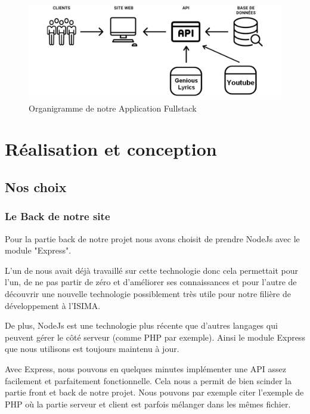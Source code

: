 \documentclass[12pt,french]{article}
\begin{document}
\begin{figure}[H]
	\centering
	\includegraphics[scale=0.4]{fullstack.png}
	\caption{Organigramme de notre Application Fullstack}    
\end{figure}

\section{Réalisation et conception}

\subsection{Nos choix}

\subsubsection{Le Back de notre site}

Pour la partie back de notre projet nous avons choisit de prendre NodeJs avec le module "Express".

\medskip

L'un de nous avait déjà travaillé sur cette technologie donc cela permettait pour l'un, de ne pas partir de zéro et d'améliorer ses connaissances et pour l'autre de découvrir une nouvelle technologie possiblement très utile pour notre filière de développement à l'ISIMA.

\medskip

De plus, NodeJs est une technologie plus récente que d'autres langages qui peuvent gérer le côté serveur (comme PHP par exemple). Ainsi le module Express que nous utilisons est toujours maintenu à jour.

\medskip

Avec Express, nous pouvons en quelques minutes implémenter une API assez facilement et parfaitement fonctionnelle. Cela nous a permit de bien scinder la partie front et back de notre projet.
Nous pouvons par exemple citer l'exemple de PHP où la partie serveur et client est parfois mélanger dans les mêmes fichier.
\end{document}
